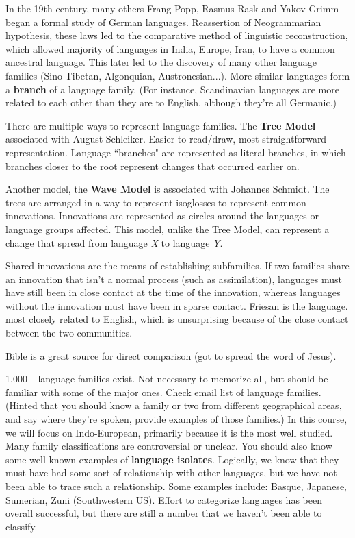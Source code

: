 \documentclass{exam}
\begin{document}
In the 19th century, many others Frang Popp, Rasmus Rask and Yakov Grimm began a formal study of German languages. Reassertion of Neogrammarian hypothesis, these laws led to the comparative method of linguistic reconstruction, which allowed majority of languages in India, Europe, Iran, to have a common ancestral language. This later led to the discovery of many other language families (Sino-Tibetan, Algonquian, Austronesian...). More similar languages form a \textbf{branch} of a language family. (For instance, Scandinavian languages are more related to each other than they are to English, although they're all Germanic.)

There are multiple ways to represent language families. The \textbf{Tree Model} associated with August Schleiker. Easier to read/draw, most straightforward representation. Language ``branches" are represented as literal branches, in which branches closer to the root represent changes that occurred earlier on. 


Another model, the \textbf{Wave Model} is associated with Johannes Schmidt. The trees are arranged in a way to represent isoglosses to represent common innovations. Innovations are represented as circles around the languages or language groups affected. This model, unlike the Tree Model, can represent a change that spread from language \textit{X} to language \textit{Y}. 

Shared innovations are the means of establishing subfamilies. If two families share an innovation that isn't a normal process (such as assimilation), languages must have still been in close contact at the time of the innovation, whereas languages without the innovation must have been in sparse contact. Friesan is the language. most closely related to English, which is unsurprising because of the close contact between the two communities. 

Bible is a great source for direct comparison (got to spread the word of Jesus). 


1,000+ language families exist. Not necessary to memorize all, but should be familiar with some of the major ones. Check email list of language families. (Hinted that you should know a family or two from different geographical areas, and say where they're spoken, provide examples of those families.) In this course, we will focus on Indo-European, primarily because it is the most well studied. Many family classifications are controversial or unclear. You should also know some well known examples of \textbf{language isolates}. Logically, we know that they must have had some sort of relationship with other languages, but we have not been able to trace such a relationship. Some examples include: Basque, Japanese, Sumerian, Zuni (Southwestern US). Effort to categorize languages has been overall successful, but there are still a number that we haven't been able to classify. 
\end{document}
